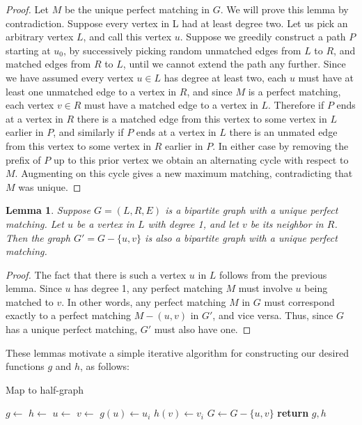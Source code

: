 \documentclass{hmcpset}
\newtheorem{lemma}{Lemma}
\begin{document}
\begin{solution}
\begin{enumerate}
\begin{proof}
  Let $M$ be the unique perfect matching in $G$. We will prove this lemma
  by contradiction. Suppose every vertex in L had at least
  degree two. Let us pick an arbitrary vertex $L$, and call this vertex $u$.
  Suppose we greedily construct a path $P$ starting at $u_0$, by successively picking
  random unmatched edges from $L$ to $R$, and matched edges from $R$ to $L$, until
  we cannot extend the path any further.
  Since we have assumed every vertex $u \in L$ has degree at least two, each $u$
  must have at least one unmatched edge to a vertex in $R$, and since $M$ is a
  perfect matching, each vertex $v \in R$ must have a matched edge to a vertex in $L$.
  Therefore if $P$ ends at a vertex in $R$ there is a matched edge from this vertex
  to some vertex in $L$ earlier in $P$, and similarly if $P$ ends at a vertex in $L$
  there is an unmated edge from this vertex to some vertex in $R$ earlier in $P$.
  In either case by removing the prefix of $P$ up to this prior vertex we obtain an
  alternating cycle with respect to $M$. Augmenting on this cycle gives a new maximum
  matching, contradicting that $M$ was unique.
\end{proof}

\begin{lemma}
  Suppose $G = (L, R, E)$ is a bipartite graph with a unique perfect matching. Let
  $u$ be a vertex in $L$ with degree 1, and let $v$ be its neighbor in $R$. Then
  the graph $G' = G - \{u, v\}$ is also a bipartite graph
  with a unique perfect matching.
\end{lemma}

\begin{proof}
  The fact that there is such a vertex $u$ in $L$ follows from the previous lemma.
  Since $u$ has degree 1, any perfect matching $M$ must involve $u$ being matched
  to $v$. In other words, any perfect matching $M$ in $G$ must correspond exactly to
  a perfect matching $M - (u, v)$ in $G'$, and vice versa. Thus, since $G$ has a
  unique perfect matching, $G'$ must also have one.
\end{proof}

These lemmas motivate a simple iterative algorithm for constructing our desired
functions $g$ and $h$, as follows:

\begin{algorithm}
  \caption{Map to half-graph}
  \begin{algorithmic}[1]
    \State $g\gets$ 
    \State $h\gets$ 
      \State $u\gets$ 
      \State $v\gets$ 
      \State $g(u)\gets u_i$
      \State $h(v)\gets v_i$
      \State $G\gets G - \{u, v\}$
    \EndFor
    \State \textbf{return} $g, h$
    \EndProcedure
  \end{algorithmic}
\end{algorithm}


\end{enumerate}
\end{solution}
\end{document}
